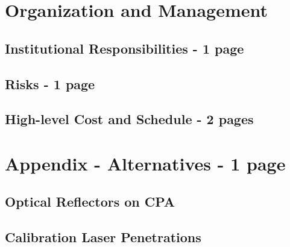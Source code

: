 \clearpage
\section{Organization and Management}
\label{sec:fdsp-hv-org}


\subsection{Institutional Responsibilities - 1 page}
\label{sec:fdsp-hv-org-consortium}
\subsection{Risks - 1 page}
\label{sec:fdsp-hv-org-risk}

\subsection{High-level Cost and Schedule - 2 pages}
\label{sec:fdsp-hv-org-cs}



\clearpage


\section{Appendix - Alternatives - 1 page}

\subsection{Optical Reflectors on CPA}
\subsection{Calibration Laser Penetrations}
